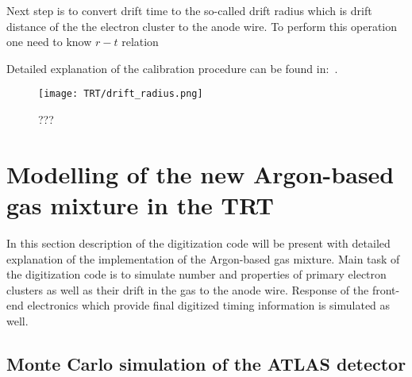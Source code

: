 Next step is to convert drift time to the so-called drift radius which is drift distance of the the electron cluster to the anode wire.
To perform this operation one need to know $r-t$ relation

Detailed explanation of the calibration procedure can be found in:~\cite{alonso_thesis}.

\begin{figure}
\centering
\texttt{[image: TRT/drift\_radius.png]}
\caption{ 
 ???
}
\label{fig:electronics}
\end{figure}

\section{Modelling of the new Argon-based gas mixture in the TRT}
\label{sec:digi_argon}

In this section description of the digitization code will be present with detailed explanation of the implementation of the Argon-based gas mixture.
Main task of the digitization code is to simulate number and properties of primary electron clusters as well as their drift in the gas to the anode wire.
Response of the front-end electronics which provide final digitized timing information is simulated as well.

\subsection{Monte Carlo simulation of the ATLAS detector}

